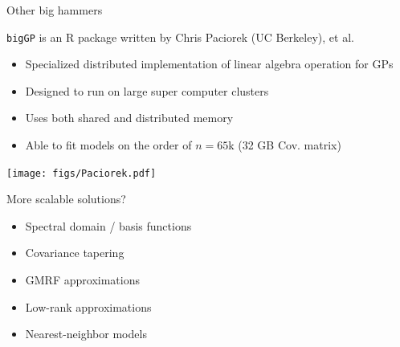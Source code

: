 \documentclass[11pt,ignorenonframetext,]{beamer}
\providecommand{\tightlist}{%
  \setlength{\itemsep}{0pt}\setlength{\parskip}{0pt}}
\begin{document}
\begin{frame}[fragile]{Other big hammers}
\protect\hypertarget{other-big-hammers}{}

\small

\texttt{bigGP} is an R package written by Chris Paciorek (UC Berkeley),
et al.

\begin{itemize}
\item
  Specialized distributed implementation of linear algebra operation for
  GPs
\item
  Designed to run on large super computer clusters
\item
  Uses both shared and distributed memory
\item
  Able to fit models on the order of \(n = 65\)k (32 GB Cov. matrix)
\end{itemize}

\vspace{-3mm}

\begin{center}
\texttt{[image: figs/Paciorek.pdf]}
\end{center}

\end{frame}

\begin{frame}{More scalable solutions?}
\protect\hypertarget{more-scalable-solutions}{}

\large

\begin{itemize}
\tightlist
\item
  Spectral domain / basis functions
\end{itemize}

\vspace{3mm}

\begin{itemize}
\tightlist
\item
  Covariance tapering
\end{itemize}

\vspace{3mm}

\begin{itemize}
\tightlist
\item
  GMRF approximations
\end{itemize}

\vspace{3mm}

\begin{itemize}
\tightlist
\item
  Low-rank approximations
\end{itemize}

\vspace{3mm}

\begin{itemize}
\tightlist
\item
  Nearest-neighbor models
\end{itemize}

\end{frame}
\end{document}
